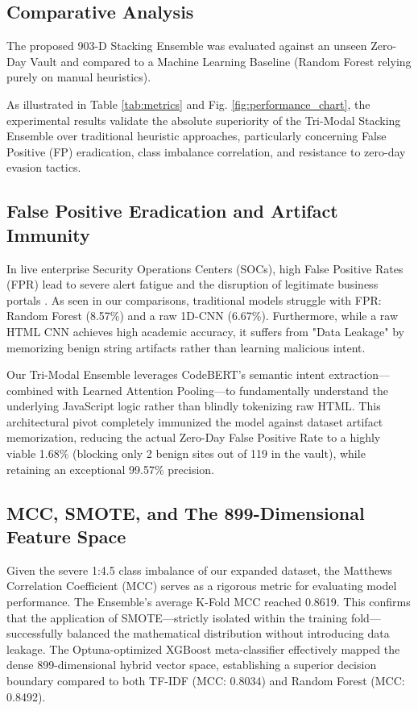 \documentclass[conference]{IEEEtran}
\begin{document}
\subsection{Comparative Analysis}
The proposed 903-D Stacking Ensemble was evaluated against an unseen Zero-Day Vault and compared to a Machine Learning Baseline (Random Forest relying purely on manual heuristics). 

As illustrated in Table \ref{tab:metrics} and Fig. \ref{fig:performance_chart}, the experimental results validate the absolute superiority of the Tri-Modal Stacking Ensemble over traditional heuristic approaches, particularly concerning False Positive (FP) eradication, class imbalance correlation, and resistance to zero-day evasion tactics.

\subsection{False Positive Eradication and Artifact Immunity}
In live enterprise Security Operations Centers (SOCs), high False Positive Rates (FPR) lead to severe alert fatigue and the disruption of legitimate business portals \cite{oest}. As seen in our comparisons, traditional models struggle with FPR: Random Forest (8.57\%) and a raw 1D-CNN (6.67\%). Furthermore, while a raw HTML CNN achieves high academic accuracy, it suffers from "Data Leakage" by memorizing benign string artifacts rather than learning malicious intent.

Our Tri-Modal Ensemble leverages CodeBERT's \cite{codebert} semantic intent extraction—combined with Learned Attention Pooling—to fundamentally understand the underlying JavaScript logic rather than blindly tokenizing raw HTML. This architectural pivot completely immunized the model against dataset artifact memorization, reducing the actual Zero-Day False Positive Rate to a highly viable 1.68\% (blocking only 2 benign sites out of 119 in the vault), while retaining an exceptional 99.57\% precision.

\subsection{MCC, SMOTE, and The 899-Dimensional Feature Space}
Given the severe 1:4.5 class imbalance of our expanded dataset, the Matthews Correlation Coefficient (MCC) serves as a rigorous metric for evaluating model performance. The Ensemble's average K-Fold MCC reached 0.8619. This confirms that the application of SMOTE—strictly isolated within the training fold—successfully balanced the mathematical distribution without introducing data leakage. The Optuna-optimized XGBoost \cite{xgboost} meta-classifier effectively mapped the dense 899-dimensional hybrid vector space, establishing a superior decision boundary compared to both TF-IDF (MCC: 0.8034) and Random Forest (MCC: 0.8492).
\end{document}
